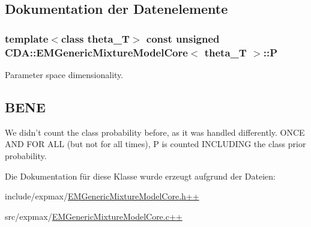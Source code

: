 \subsection{Dokumentation der Datenelemente}
\hypertarget{classCDA_1_1EMGenericMixtureModelCore_ac31ee51281c9984de28e57351758a1a4}{
\subsubsection[{P}]{\setlength{\rightskip}{0pt plus 5cm}template$<$class theta\_\-T$>$ const unsigned {\bf CDA::EMGenericMixtureModelCore}$<$ theta\_\-T $>$::{\bf P}}}
\label{classCDA_1_1EMGenericMixtureModelCore_ac31ee51281c9984de28e57351758a1a4}


Parameter space dimensionality. 

\hypertarget{classCDA_1_1GaussianMixtureModelNDParams_NOTA}{}\subsection{BENE}\label{classCDA_1_1GaussianMixtureModelNDParams_NOTA}
We didn't count the class probability before, as it was handled differently. ONCE AND FOR ALL (but not for all times), P is counted INCLUDING the class prior probability. 

Die Dokumentation für diese Klasse wurde erzeugt aufgrund der Dateien:\begin{DoxyCompactItemize}
\item 
include/expmax/\hyperlink{EMGenericMixtureModelCore_8h_09_09}{EMGenericMixtureModelCore.h++}\item 
src/expmax/\hyperlink{EMGenericMixtureModelCore_8c_09_09}{EMGenericMixtureModelCore.c++}\end{DoxyCompactItemize}
